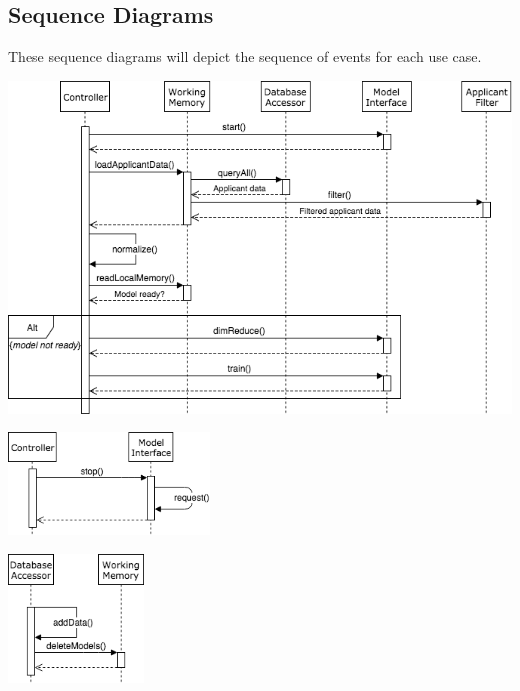 \documentclass[titlepage]{article}
\begin{document}
\subsection{Sequence Diagrams}
These sequence diagrams will depict the sequence of events for each use case.
\begin{center}
	\includegraphics[width=\textwidth]{AdvolStartupSequenceDiagram.png}
\label{fig:startup sequence diagram}
\end{center}
\begin{center}
	\includegraphics[width=0.4\textwidth]{AdvolShutdownSequenceDiagram.png}
\label{fig:shutdown sequence diagram}
\end{center}%
\begin{center}
	\includegraphics[width=0.27\textwidth]{AdvolAddDataSequenceDiagram.png}
\label{fig:add data sequence diagram}
\end{center}
\end{document}
